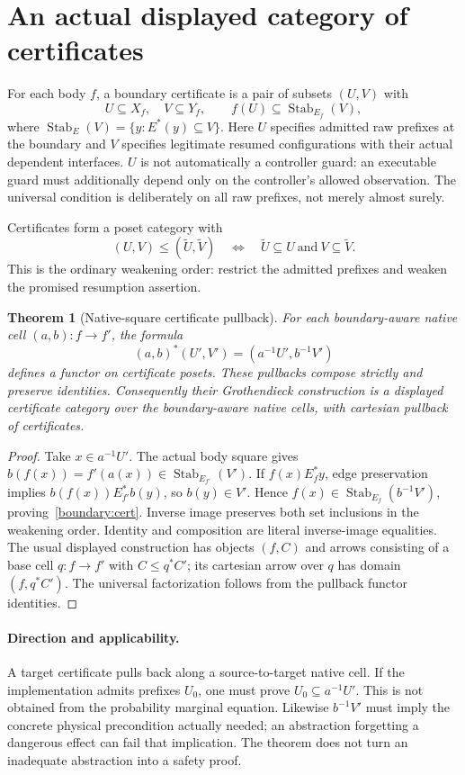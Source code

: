 \documentclass[11pt]{article}
\newtheorem{theorem}{Theorem}[section]
\newcommand{\Stab}{\operatorname{Stab}}
\begin{document}
\section{An actual displayed category of certificates}
For each body $f$, a boundary certificate is a pair of subsets $(U,V)$ with
\begin{equation}\label{boundary:cert}
 U\subseteq X_f,\quad V\subseteq Y_f,\qquad f(U)\subseteq\Stab_{E_f}(V),
\end{equation}
where $\Stab_E(V)=\{y:E^*(y)\subseteq V\}$. Here $U$ specifies admitted raw prefixes at the boundary and $V$ specifies legitimate resumed configurations with their actual dependent interfaces. $U$ is not automatically a controller guard: an executable guard must additionally depend only on the controller's allowed observation. The universal condition is deliberately on all raw prefixes, not merely almost surely.

Certificates form a poset category with
\[
 (U,V)\le(\widetilde U,\widetilde V)
 \quad\Longleftrightarrow\quad
 \widetilde U\subseteq U\ \text{and}\ V\subseteq\widetilde V.
\]
This is the ordinary weakening order: restrict the admitted prefixes and weaken the promised resumption assertion.

\begin{theorem}[Native-square certificate pullback]\label{boundary:pull}
For each boundary-aware native cell $(a,b):f\to f'$, the formula
\[
 (a,b)^*(U',V')=(a^{-1}U',b^{-1}V')
\]
defines a functor on certificate posets. These pullbacks compose strictly and preserve identities. Consequently their Grothendieck construction is a displayed certificate category over the boundary-aware native cells, with cartesian pullback of certificates.
\end{theorem}
\begin{proof}
Take $x\in a^{-1}U'$. The actual body square gives
$b(f(x))=f'(a(x))\in\Stab_{E_{f'}}(V')$. If $f(x)E_f^*y$, edge preservation implies $b(f(x))E_{f'}^*b(y)$, so $b(y)\in V'$. Hence $f(x)\in\Stab_{E_f}(b^{-1}V')$, proving~\eqref{boundary:cert}. Inverse image preserves both set inclusions in the weakening order. Identity and composition are literal inverse-image equalities. The usual displayed construction has objects $(f,C)$ and arrows consisting of a base cell $q:f\to f'$ with $C\le q^*C'$; its cartesian arrow over $q$ has domain $(f,q^*C')$. The universal factorization follows from the pullback functor identities.
\end{proof}

\paragraph{Direction and applicability.} A target certificate pulls back along a source-to-target native cell. If the implementation admits prefixes $U_0$, one must prove $U_0\subseteq a^{-1}U'$. This is not obtained from the probability marginal equation. Likewise $b^{-1}V'$ must imply the concrete physical precondition actually needed; an abstraction forgetting a dangerous effect can fail that implication. The theorem does not turn an inadequate abstraction into a safety proof.
\end{document}
